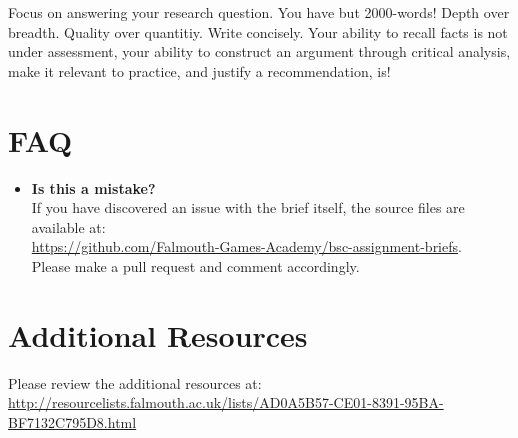 \documentclass{../../../fal_assignment}
\begin{document}
Focus on answering your research question. You have but 2000-words! Depth over breadth. Quality over quantitiy. Write concisely. Your ability to recall facts is not under assessment, your ability to construct an argument through critical analysis, make it relevant to practice, and justify a recommendation, is!

\section*{FAQ}

\begin{itemize}  		
    	\item 	\textbf{Is this a mistake?} \\ 	
    		If you have discovered an issue with the brief itself, the source files are available at: \\
    		\url{https://github.com/Falmouth-Games-Academy/bsc-assignment-briefs}.\\
    		 Please make a pull request and comment accordingly.
\end{itemize}

\section*{Additional Resources}

Please review the additional resources at: \url{http://resourcelists.falmouth.ac.uk/lists/AD0A5B57-CE01-8391-95BA-BF7132C795D8.html}
\end{document}
